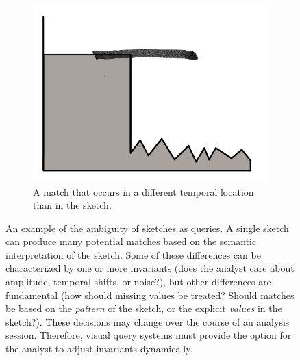 {\begin{figure}
\begin{subfigure}[t]{.25\textwidth}
		\includegraphics[width=\textwidth]{./figures/temporal}
		\caption{A match that occurs in a different temporal location than in the sketch.}
	\end{subfigure}
	\caption{An example of the ambiguity of sketches as queries. A single sketch can produce many potential matches based on the semantic interpretation of the sketch. Some of these differences can be characterized by one or more invariants (does the analyst care about amplitude, temporal shifts, or noise?), but other differences are fundamental (how should missing values be treated? Should matches be based on the \emph{pattern} of the sketch, or the explicit \emph{values} in the sketch?). These decisions may change over the course of an analysis session. Therefore, visual query systems must provide the option for the analyst to adjust invariants dynamically.}
	\label{fig:invariances}
\end{figure}
}

